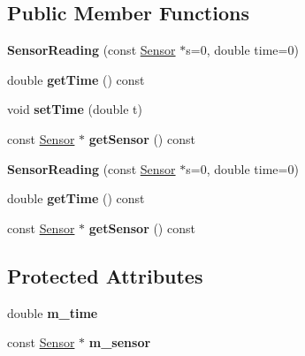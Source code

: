 \subsection*{Public Member Functions}
\begin{DoxyCompactItemize}
\item 
\mbox{\label{classGMapping_1_1SensorReading_a157ca2dd69651af8a4ac343868773559}} 
{\bfseries Sensor\+Reading} (const \hyperlink{classGMapping_1_1Sensor}{Sensor} $\ast$s=0, double time=0)
\item 
\mbox{\label{classGMapping_1_1SensorReading_afa80948b19650a98ae555f35e9549816}} 
double {\bfseries get\+Time} () const
\item 
\mbox{\label{classGMapping_1_1SensorReading_ace6521ab76975d9850a5f649b8113108}} 
void {\bfseries set\+Time} (double t)
\item 
\mbox{\label{classGMapping_1_1SensorReading_a457157dca323ce038a32eef0a123d05f}} 
const \hyperlink{classGMapping_1_1Sensor}{Sensor} $\ast$ {\bfseries get\+Sensor} () const
\item 
\mbox{\label{classGMapping_1_1SensorReading_a157ca2dd69651af8a4ac343868773559}} 
{\bfseries Sensor\+Reading} (const \hyperlink{classGMapping_1_1Sensor}{Sensor} $\ast$s=0, double time=0)
\item 
\mbox{\label{classGMapping_1_1SensorReading_afa80948b19650a98ae555f35e9549816}} 
double {\bfseries get\+Time} () const
\item 
\mbox{\label{classGMapping_1_1SensorReading_a457157dca323ce038a32eef0a123d05f}} 
const \hyperlink{classGMapping_1_1Sensor}{Sensor} $\ast$ {\bfseries get\+Sensor} () const
\end{DoxyCompactItemize}
\subsection*{Protected Attributes}
\begin{DoxyCompactItemize}
\item 
\mbox{\label{classGMapping_1_1SensorReading_aa8965e26c4cc6be0036bb7f910fbee7d}} 
double {\bfseries m\+\_\+time}
\item 
\mbox{\label{classGMapping_1_1SensorReading_a7b8d0f68d6ec05d068ac44c2806904e9}} 
const \hyperlink{classGMapping_1_1Sensor}{Sensor} $\ast$ {\bfseries m\+\_\+sensor}
\end{DoxyCompactItemize}


